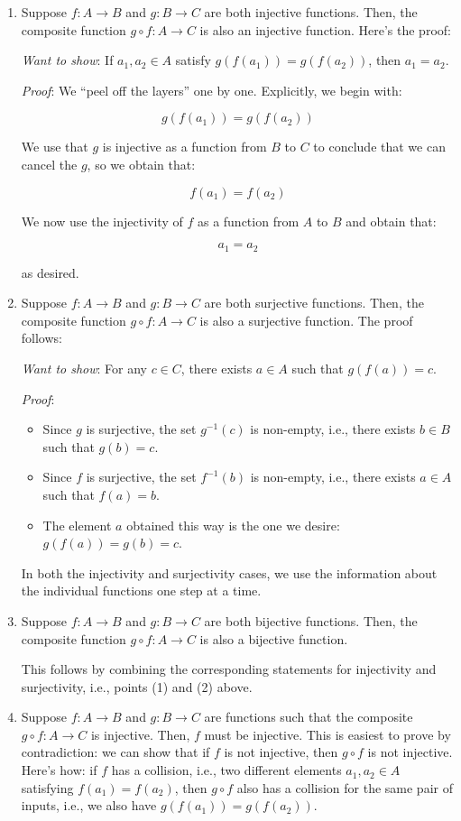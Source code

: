 \documentclass[10pt]{amsart}
\begin{document}
\begin{enumerate}
\item Suppose $f:A \to B$ and $g:B \to C$ are both injective
  functions. Then, the composite function $g \circ f:A \to C$ is also
  an injective function. Here's the proof:

  {\em Want to show}: If $a_1,a_2 \in A$ satisfy $g(f(a_1)) =
  g(f(a_2))$, then $a_1 = a_2$.

  {\em Proof}: We ``peel off the layers'' one by one. Explicitly, we
  begin with:

  $$g(f(a_1)) = g(f(a_2))$$

  We use that $g$ is injective as a function from $B$ to $C$ to
  conclude that we can cancel the $g$, so we obtain that:

  $$f(a_1) = f(a_2)$$

  We now use the injectivity of $f$ as a function from $A$ to $B$ and
  obtain that:

  $$a_1 = a_2$$

  as desired.
\item Suppose $f:A \to B$ and $g:B \to C$ are both surjective
  functions. Then, the composite function $g \circ f:A \to C$ is also
  a surjective function. The proof follows:

  {\em Want to show}: For any $c \in C$, there exists $a \in A$ such
  that $g(f(a)) = c$.

  {\em Proof}:

  \begin{itemize}
  \item Since $g$ is surjective, the set $g^{-1}(c)$ is non-empty,
    i.e., there exists $b \in B$ such that $g(b) = c$.
  \item Since $f$ is surjective, the set $f^{-1}(b)$ is non-empty,
    i.e., there exists $a \in A$ such that $f(a) = b$.
  \item The element $a$ obtained this way is the one we desire:
    $g(f(a)) = g(b) = c$.
  \end{itemize}

  In both the injectivity and surjectivity cases, we use the
  information about the individual functions one step at a time.
\item Suppose $f:A \to B$ and $g:B \to C$ are both bijective
  functions. Then, the composite function $g \circ f:A \to C$ is also
  a bijective function.

  This follows by combining the corresponding statements for
  injectivity and surjectivity, i.e., points (1) and (2) above.
\item Suppose $f:A \to B$ and $g:B \to C$ are functions such that the
  composite $g \circ f: A \to C$ is injective. Then, $f$ must be
  injective. This is easiest to prove by contradiction: we can show
  that if $f$ is not injective, then $g \circ f$ is not
  injective. Here's how: if $f$ has a collision, i.e., two different
  elements $a_1, a_2 \in A$ satisfying $f(a_1) = f(a_2)$, then $g
  \circ f$ also has a collision for the same pair of inputs, i.e., we
  also have $g(f(a_1)) = g(f(a_2))$.


\end{enumerate}
\end{document}
